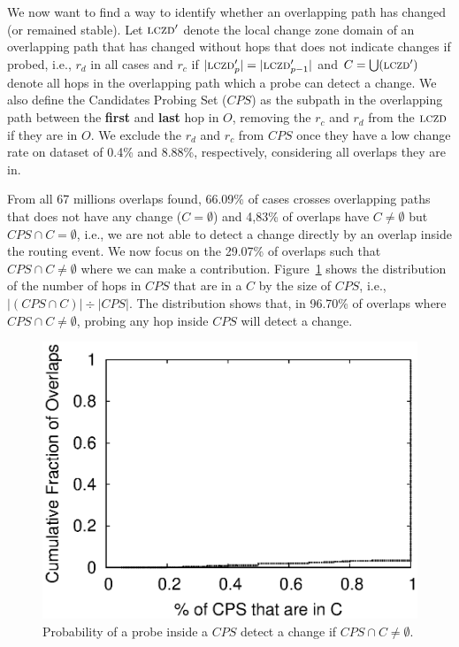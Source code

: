 
 
We now want to find a way to identify whether an overlapping path
has changed (or remained stable). Let $\mathrm{\textsc{lczd}}'$ denote the local
change zone domain of an overlapping path that has changed without
hops that does not indicate changes if probed, i.e., $r_d$ in all cases 
and $r_c$ if $|\mathrm{\textsc{lczd}}'_{p}| = |\mathrm{\textsc{lczd}}'_{p-1}|$ and $C = \bigcup(\mathrm{\textsc{lczd}}')$ 
denote all hops in the overlapping path which a probe can detect a change.
We also define the Candidates Probing Set ($CPS$) as the subpath 
in the overlapping path between the \textbf{first} and \textbf{last} hop in $O$,
removing the $r_c$ and $r_d$ from the $\mathrm{\textsc{lczd}}$ if they are in $O$. 
We exclude the $r_d$ and $r_c$ from $CPS$ once they have a low change 
rate on dataset of 0.4\% and 8.88\%, respectively, considering all overlaps they are in.

From all 67 millions overlaps found, 66.09\% of cases crosses overlapping paths 
that does not have any change ($C = \emptyset$) and 4,83\% of overlaps have 
$C \ne \emptyset$ but $CPS \cap C = \emptyset$, 
i.e., we are not able to detect a change directly by an overlap inside the 
routing event. We now focus on the 29.07\% of overlaps such that $CPS \cap C \ne \emptyset$
where we can make a contribution. Figure~\ref{fig:lczd.intersection}  
shows the distribution of the number of hops in $CPS$ that are in a $C$ by the size of $CPS$,
i.e., $|(CPS \cap C)| \div |CPS|$.  The distribution shows that,
in 96.70\% of overlaps where $CPS \cap C \ne \emptyset$, probing any hop inside $CPS$ 
will detect a change.



\begin{figure}
\begin{center}
\includegraphics[width=0.8\columnwidth]{figs/patching/overlapcoverage/overlapcoverage_only_lczd.eps}
\caption{Probability of a probe inside a $CPS$ detect a change if $CPS \cap C \ne \emptyset$.}
\label{fig:lczd.intersection}
\end{center}
%
\end{figure}
